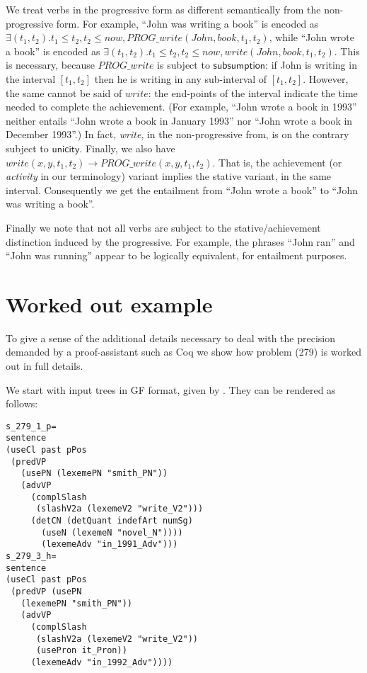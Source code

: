 \documentclass[a4paper,11pt]{article}
\newcommand\constant[1]{\mathsf{#1}}
\begin{document}
We treat verbs in the progressive form as different semantically from
the non-progressive form. For example, ``John was writing a book'' is
encoded as
$∃(t_1, t_2). t_1≤ t_2, t_2 ≤ now, PROG\_write(John,book,t_1,t_2)$,
while ``John wrote a book'' is encoded as
$∃(t_1, t_2). t_1≤ t_2, t_2 ≤ now, write(John,book,t_1,t_2)$. This is
necessary, because $PROG\_write$ is subject to
$\constant{subsumption}$: if John is writing in the interval
$[t_1,t_2]$ then he is writing in any sub-interval of
$[t_1,t_2]$. However, the same cannot be said of $write$: the
end-points of the interval indicate the time needed to complete the
achievement. (For example, ``John wrote a book in 1993'' neither
entails ``John wrote a book in January 1993'' nor ``John wrote a book
in December 1993''.) In fact, \emph{write}, in the non-progressive
from, is on the contrary subject to $\constant{unicity}$. Finally, we
also have $write(x,y,t_1,t_2) → PROG\_write(x,y,t_1,t_2)$. That is,
the achievement (or \emph{activity} in our terminology) variant implies the stative variant, in the
same interval.  Consequently we get the entailment from ``John wrote a
book'' to ``John was writing a book''.

Finally we note that not all verbs are subject to the
stative/achievement distinction induced by the progressive. For
example, the phrases ``John ran'' and ``John was running'' appear to be
logically equivalent, for entailment purposes.


\section{Worked out example}
To give a sense of the additional details necessary to deal with the
precision demanded by a proof-assistant such as Coq we show how
problem (279) is worked out in full details.

We start with input trees in GF format, given by
\citet{Ljunglof:2012}. They can be rendered as follows:

\begin{small}
\begin{verbatim}
s_279_1_p=
sentence
(useCl past pPos
 (predVP
   (usePN (lexemePN "smith_PN"))
   (advVP
     (complSlash
      (slashV2a (lexemeV2 "write_V2")))
     (detCN (detQuant indefArt numSg)
       (useN (lexemeN "novel_N"))))
       (lexemeAdv "in_1991_Adv")))
s_279_3_h=
sentence
(useCl past pPos
 (predVP (usePN
   (lexemePN "smith_PN"))
   (advVP
     (complSlash
      (slashV2a (lexemeV2 "write_V2"))
      (usePron it_Pron))
     (lexemeAdv "in_1992_Adv"))))
\end{verbatim}
\end{small}
\end{document}

